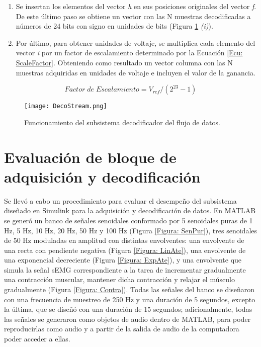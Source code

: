 \begin{enumerate}
	\item Se insertan los elementos del vector \emph{h} en sus posiciones originales del vector \emph{f}. De este último paso se obtiene un vector con las N muestras decodificadas a números de 24 bits con signo en unidades de bits (Figura \ref{Figura: DecoStream} \emph{(i)}).
	
	\item Por último, para  obtener unidades de voltaje, se multiplica cada elemento del vector \emph{i} por un factor de escalamiento determinado por la Ecuación \ref{Ecu: ScaleFactor}. Obteniendo como resultado un vector columna con las N muestras adquiridas en unidades de voltaje e incluyen el valor de la ganancia.
\end{enumerate}

\vfill
\begin{equation}
	Factor\; de\; Escalamiento = V_{ref}/(2^{23}-1)
	\label{Ecu: ScaleFactor}
\end{equation}
\vfill
\begin{figure}[htbb]
\centering
	\texttt{[image: DecoStream.png]}
	\caption{Funcionamiento del subsistema decodificador del flujo de datos.}
	\label{Figura: DecoStream}
\end{figure}
\vfill

\newpage
\section{Evaluación de bloque de adquisición y decodificación}\label{Sec: EvalAdquisicion}
Se llevó a cabo un procedimiento para evaluar el desempeño del subsistema diseñado en Simulink\textregistered \; para la adquisición y decodificación de datos. En MATLAB\textregistered \; se generó un banco de señales senoidales conformado por 5 senoidales puras de 1 Hz, 5 Hz, 10 Hz, 20 Hz, 50 Hz y 100 Hz (Figura \ref{Figura: SenPur}), tres senoidales de 50 Hz moduladas en amplitud con distintas envolventes: 
una envolvente de una recta con pendiente negativa (Figura \ref{Figura: LinAte}), una envolvente de una exponencial decreciente (Figura \ref{Figura: ExpAte}), y una envolvente que simula la señal sEMG correspondiente a la tarea de incrementar gradualmente una contracción muscular, mantener dicha contracción y relajar el músculo gradualmente (Figura \ref{Figura: Contra}). Todas las señales del banco se diseñaron con una frecuencia de muestreo de 250 Hz y una duración de 5 segundos, excepto la última, que se diseñó con una duración de 15 segundos; adicionalmente, todas las señales se generaron como objetos de audio dentro de MATLAB\textregistered, para poder reproducirlas como audio y a partir de la salida de audio de la computadora poder acceder a ellas.

